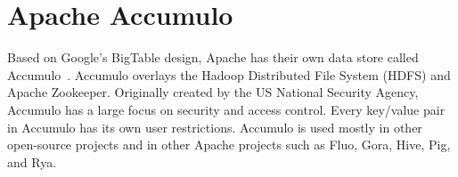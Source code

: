 \section{Apache Accumulo}

Based on Google's BigTable design, Apache has their own
data store called Accumulo~\cite{hid-sp18-526-www-apache-accumulo}.
Accumulo overlays the Hadoop Distributed File System (HDFS) and
Apache Zookeeper. Originally created by the US National Security
Agency, Accumulo has a large focus on security and access control. 
Every key/value pair in Accumulo has its own user restrictions. 
Accumulo is used mostly in other open-source projects and in other 
Apache projects such as Fluo, Gora, Hive, Pig, and Rya.

